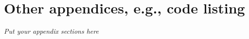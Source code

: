 \documentclass{report}
\begin{document}



\appendix

\printbibliography

\chapter{Other appendices, e.g., code listing}  %
\emph{Put your appendix sections here}

\end{document}
